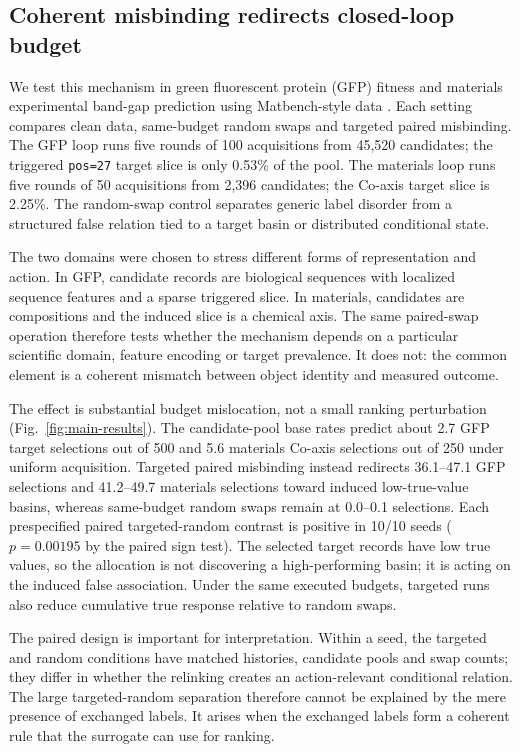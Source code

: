 \subsection*{Coherent misbinding redirects closed-loop budget}
We test this mechanism in green fluorescent protein (GFP) fitness \citep{sarkisyan2016gfp,romero2012proteinfitness} and materials experimental band-gap prediction using Matbench-style data \citep{dunn2020matbench}. Each setting compares clean data, same-budget random swaps and targeted paired misbinding. The GFP loop runs five rounds of 100 acquisitions from 45,520 candidates; the triggered \texttt{pos=27} target slice is only 0.53\% of the pool. The materials loop runs five rounds of 50 acquisitions from 2,396 candidates; the Co-axis target slice is 2.25\%. The random-swap control separates generic label disorder from a structured false relation tied to a target basin or distributed conditional state.

The two domains were chosen to stress different forms of representation and action. In GFP, candidate records are biological sequences with localized sequence features and a sparse triggered slice. In materials, candidates are compositions and the induced slice is a chemical axis. The same paired-swap operation therefore tests whether the mechanism depends on a particular scientific domain, feature encoding or target prevalence. It does not: the common element is a coherent mismatch between object identity and measured outcome.

The effect is substantial budget mislocation, not a small ranking perturbation (Fig.~\ref{fig:main-results}). The candidate-pool base rates predict about 2.7 GFP target selections out of 500 and 5.6 materials Co-axis selections out of 250 under uniform acquisition. Targeted paired misbinding instead redirects 36.1--47.1 GFP selections and 41.2--49.7 materials selections toward induced low-true-value basins, whereas same-budget random swaps remain at 0.0--0.1 selections. Each prespecified paired targeted-random contrast is positive in 10/10 seeds (\(p=0.00195\) by the paired sign test). The selected target records have low true values, so the allocation is not discovering a high-performing basin; it is acting on the induced false association. Under the same executed budgets, targeted runs also reduce cumulative true response relative to random swaps.

The paired design is important for interpretation. Within a seed, the targeted and random conditions have matched histories, candidate pools and swap counts; they differ in whether the relinking creates an action-relevant conditional relation. The large targeted-random separation therefore cannot be explained by the mere presence of exchanged labels. It arises when the exchanged labels form a coherent rule that the surrogate can use for ranking.

